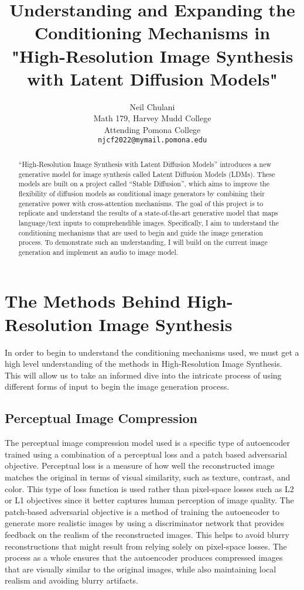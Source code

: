 \documentclass{article}
\title{Understanding and Expanding the Conditioning Mechanisms in "High-Resolution Image Synthesis with Latent Diffusion Models"}
\author{
  Neil Chulani\\
  Math 179, Harvey Mudd College\\
  Attending Pomona College\\
  \texttt{njcf2022@mymail.pomona.edu} \\
}
\begin{document}
\maketitle

\begin{abstract}
  “High-Resolution Image Synthesis with Latent Diffusion Models” introduces a new generative model for image synthesis called Latent Diffusion Models (LDMs). These models are built on a project called “Stable Diffusion”, which aims to improve the flexibility of diffusion models as conditional image generators by combining their generative power with cross-attention mechanisms. The goal of this project is to replicate and understand the results of a state-of-the-art generative model that maps language/text inputs to comprehendible images. Specifically, I aim to understand the conditioning mechanisms that are used to begin and guide the image generation process. To demonstrate such an understanding, I will build on the current image generation and implement an audio to image model.
\end{abstract}

\section{The Methods Behind High-Resolution Image Synthesis}

In order to begin to understand the conditioning mechanisms used, we must get a high level understanding of the methods in High-Resolution Image Synthesis. This will allow us to take an informed dive into the intricate process of using different forms of input to begin the image generation process.

\subsection{Perceptual Image Compression}

The perceptual image compression model used is a specific type of autoencoder trained using a combination of a perceptual loss and a patch based adversarial objective. Perceptual loss is a measure of how well the reconstructed image matches the original in terms of visual similarity, such as texture, contrast, and color. This type of loss function is used rather than pixel-space losses such as L2 or L1 objectives since it better captures human perception of image quality. The patch-based adversarial objective is a method of training the autoencoder to generate more realistic images by using a discriminator network that provides feedback on the realism of the reconstructed images. This helps to avoid blurry reconstructions that might result from relying solely on pixel-space losses. The process as a whole ensures that the autoencoder produces compressed images that are visually similar to the original images, while also maintaining local realism and avoiding blurry artifacts.
\end{document}

